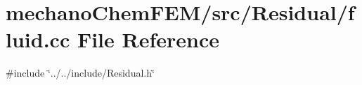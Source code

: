 \section{mechano\+Chem\+F\+E\+M/src/\+Residual/fluid.cc File Reference}
\label{fluid_8cc}
{\ttfamily \#include \char`\"{}../../include/\+Residual.\+h\char`\"{}}\newline
